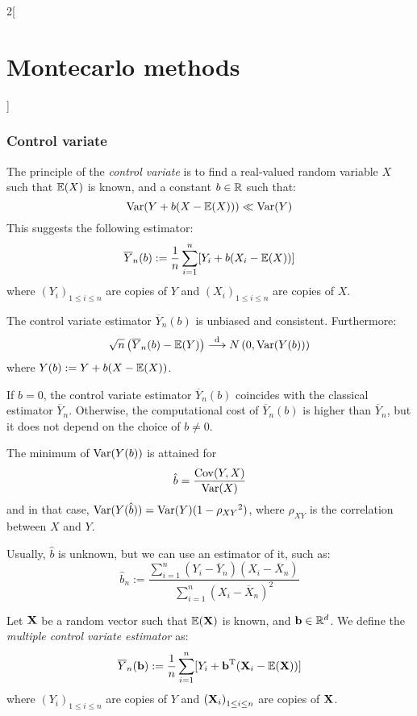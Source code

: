 \documentclass[../../../main_math.tex]{subfiles}
\begin{document}
\begin{multicols}{2}[\section{Montecarlo methods}]
  \subsubsection{Control variate}
  \begin{definition}
    The principle of the \emph{control variate} is to find a real-valued random variable $X$ such that $\mathbb{E}(X)$ is known, and a constant $b\in\mathbb{R}$ such that:
    $$
      \mathrm{Var}(Y+b(X-\mathbb{E}(X)))\ll \mathrm{Var}(Y)
    $$
    This suggests the following estimator:
    $$
      \overline{Y}_n(b):=\frac{1}{n}\sum_{i=1}^n [Y_i+b(X_i-\mathbb{E}(X))]
    $$
    where ${(Y_i)}_{1\leq i\leq n}$ are \iid copies of $Y$ and ${(X_i)}_{1\leq i\leq n}$ are \iid copies of $X$.
  \end{definition}
  \begin{lemma}
    The control variate estimator $\overline{Y}_n(b)$ is unbiased and consistent. Furthermore:
    $$
      \sqrt{n}\left(\overline{Y}_n(b)-\mathbb{E}(Y)\right)\overset{\text{d}}{\longrightarrow}N\left(0,\mathrm{Var}(Y(b))\right)
    $$
    where $Y(b):=Y+b(X-\mathbb{E}(X))$.
  \end{lemma}
  \begin{remark}
    If $b=0$, the control variate estimator $\overline{Y}_n(b)$ coincides with the classical estimator $\overline{Y}_n$. Otherwise, the computational cost of $\overline{Y}_n(b)$ is higher than $\overline{Y}_n$, but it does not depend on the choice of $b\neq 0$.
  \end{remark}
  \begin{proposition}
    The minimum of $\mathrm{Var}(Y(b))$ is attained for $$\hat{b}= \frac{\mathrm{Cov}(Y,X)}{\mathrm{Var}(X)}$$ and in that case, $\mathrm{Var}(Y(\hat{b}))=\mathrm{Var}(Y)(1-{\rho_{XY}}^2)$, where $\rho_{XY}$ is the correlation between $X$ and $Y$.
  \end{proposition}
  \begin{remark}
    Usually, $\hat{b}$ is unknown, but we can use an estimator of it, such as:
    $$
      \hat{b}_n:=\frac{\sum_{i=1}^n (Y_i-\overline{Y}_n)(X_i-\overline{X}_n)}{\sum_{i=1}^n {(X_i-\overline{X}_n)}^2}
    $$
  \end{remark}
  \begin{definition}
    Let $\boldsymbol{\mathrm{X}}$ be a random vector such that $\mathbb{E}(\boldsymbol{\mathrm{X}})$ is known, and $\boldsymbol{\mathrm{b}}\in \mathbb{R}^d$. We define the \emph{multiple control variate estimator} as:
    $$
      \overline{Y}_n(\boldsymbol{\mathrm{b}}):=\frac{1}{n}\sum_{i=1}^n [Y_i+{\boldsymbol{\mathrm{b}}}^{\mathrm{T}}(\boldsymbol{\mathrm{X}}_i-\mathbb{E}(\boldsymbol{\mathrm{X}}))]
    $$
    where ${(Y_i)}_{1\leq i\leq n}$ are \iid copies of $Y$ and ${(\boldsymbol{\mathrm{X}}_i)}_{1\leq i\leq n}$ are \iid copies of $\boldsymbol{\mathrm{X}}$.

\end{definition}
\end{multicols}
\end{document}
